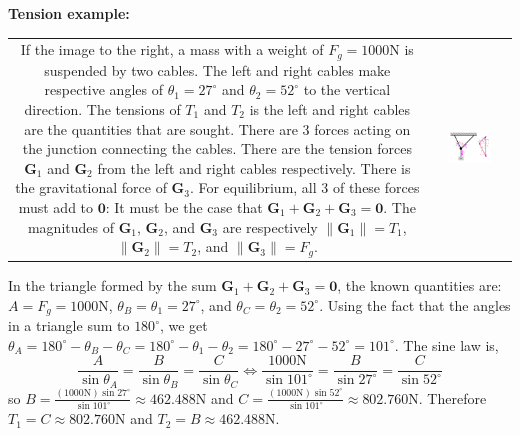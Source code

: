 \documentclass{article}
\begin{document}
\vspace{5mm}

\textbf{Tension example:}

\begin{tabular}{cc}
\parbox{0.4\textwidth}{
If the image to the right, a mass with a weight of \(F_g = 1000\text{N}\) is suspended by two cables. The left and right cables make respective angles of \(\theta_1 = 27^\circ\) and \(\theta_2 = 52^\circ\) to the vertical direction. The tensions of \(T_1\) and \(T_2\) is the left and right cables are the quantities that are sought. There are 3 forces acting on the junction connecting the cables. There are the tension forces \(\mathbf{G}_1\) and \(\mathbf{G}_2\) from the left and right cables respectively. There is the gravitational force of \(\mathbf{G}_3\). For equilibrium, all 3 of these forces must add to \(\mathbf{0}\): It must be the case that \(\mathbf{G}_1 + \mathbf{G}_2 + \mathbf{G}_3 = \mathbf{0}\). The magnitudes of \(\mathbf{G}_1\), \(\mathbf{G}_2\), and \(\mathbf{G}_3\) are respectively \(\|\mathbf{G}_1\| = T_1\), \(\|\mathbf{G}_2\| = T_2\), and \(\|\mathbf{G}_3\| = F_g\). 
} & \parbox{0.6\textwidth}{
\includegraphics[width = 0.6\textwidth]{hanging_mass}
}
\end{tabular}

In the triangle formed by the sum \(\mathbf{G}_1 + \mathbf{G}_2 + \mathbf{G}_3 = \mathbf{0}\), the known quantities are: \(A = F_g = 1000\text{N}\), \(\theta_B = \theta_1 = 27^\circ\), and \(\theta_C = \theta_2 = 52^\circ\). Using the fact that the angles in a triangle sum to \(180^\circ\), we get \(\theta_A = 180^\circ - \theta_B - \theta_C = 180^\circ - \theta_1 - \theta_2 = 180^\circ - 27^\circ - 52^\circ = 101^\circ\). The sine law is, 
\[\frac{A}{\sin\theta_A} = \frac{B}{\sin\theta_B} = \frac{C}{\sin\theta_C} \iff \frac{1000\text{N}}{\sin 101^\circ} = \frac{B}{\sin 27^\circ} = \frac{C}{\sin 52^\circ}\]
so \(B = \frac{(1000\text{N})\sin 27^\circ}{\sin 101^\circ} \approx 462.488\text{N}\) and \(C = \frac{(1000\text{N})\sin 52^\circ}{\sin 101^\circ} \approx 802.760\text{N}\). Therefore \(T_1 = C \approx 802.760\text{N}\) and \(T_2 = B \approx 462.488\text{N}\).
\end{document}
